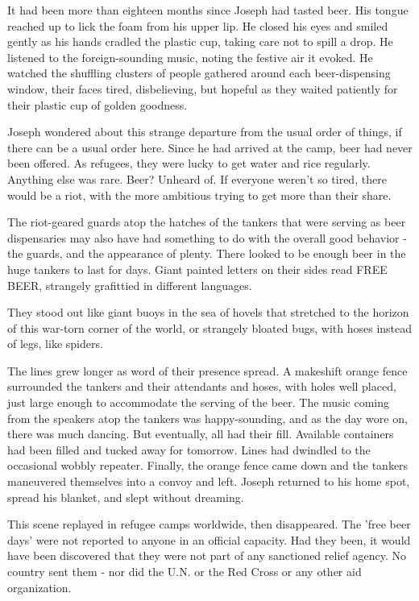 
It had been more than eighteen months since Joseph had tasted beer. His
tongue reached up to lick the foam from his upper lip. He closed his
eyes and smiled gently as his hands cradled the plastic cup, taking care
not to spill a drop. He listened to the foreign-sounding music, noting
the festive air it evoked. He watched the shuffling clusters of people
gathered around each beer-dispensing window, their faces tired,
disbelieving, but hopeful as they waited patiently for their plastic cup
of golden goodness.

Joseph wondered about this strange departure from the usual order of
things, if there can be a usual order here. Since he had arrived at the
camp, beer had never been offered. As refugees, they were lucky to get
water and rice regularly. Anything else was rare. Beer? Unheard of. If
everyone weren't so tired, there would be a riot, with the more
ambitious trying to get more than their share.

The riot-geared guards atop the hatches of the tankers that were serving
as beer dispensaries may also have had something to do with the overall
good behavior - the guards, and the appearance of plenty. There looked
to be enough beer in the huge tankers to last for days. Giant painted
letters on their sides read FREE BEER, strangely grafittied in different
languages.

They stood out like giant buoys in the sea of hovels that stretched to
the horizon of this war-torn corner of the world, or strangely bloated
bugs, with hoses instead of legs, like spiders.

The lines grew longer as word of their presence spread. A makeshift
orange fence surrounded the tankers and their attendants and hoses, with
holes well placed, just large enough to accommodate the serving of the
beer. The music coming from the speakers atop the tankers was
happy-sounding, and as the day wore on, there was much dancing. But
eventually, all had their fill. Available containers had been filled and
tucked away for tomorrow. Lines had dwindled to the occasional wobbly
repeater. Finally, the orange fence came down and the tankers maneuvered
themselves into a convoy and left. Joseph returned to his home spot,
spread his blanket, and slept without dreaming.

This scene replayed in refugee camps worldwide, then disappeared. The
'free beer days' were not reported to anyone in an official capacity.
Had they been, it would have been discovered that they were not part of
any sanctioned relief agency. No country sent them - nor did the U.N. or
the Red Cross or any other aid organization.

